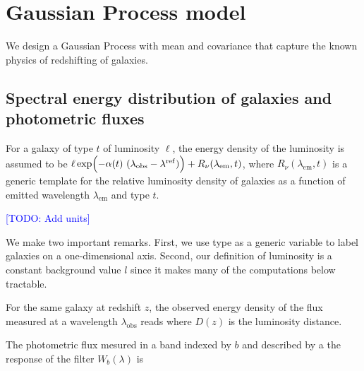 \documentclass[aps,prd,showpacs,superscriptaddress,groupedaddress]{revtex4}  %
\newcommand{\todo}[1]{\textcolor{blue}{[TODO: #1]}}
\begin{document}
\section{Gaussian Process model}

We design a Gaussian Process with mean and covariance that capture the known physics of redshifting of galaxies.

\subsection{Spectral energy distribution of galaxies and photometric fluxes}

For a galaxy of type $t$ of luminosity $\ell$, the energy density of the luminosity is assumed to be $\ell \exp\Bigl(-\alpha(t)\ (\lambda_\mathrm{obs}-\lambda^\mathrm{ref})\Bigr)  + R_\nu(\lambda_\mathrm{em},t)$, where $R_\nu(\lambda_\mathrm{em},t)$ is a generic template for the relative luminosity density of galaxies as a function of emitted wavelength $\lambda_\mathrm{em}$ and type $t$.

\todo{Add units}

We make two important remarks.
First, we use type as a generic variable to label galaxies on a one-dimensional axis. 
Second, our definition of luminosity is a constant background value $l$ since it makes many of the computations below tractable.

For the same galaxy at redshift $z$, the observed energy density of the flux measured at a wavelength $\lambda_\mathrm{obs}$ reads
where $D(z)$ is the luminosity distance.

The photometric flux mesured in a band indexed by $b$ and described by a the response of the filter $W_b(\lambda)$ is
\end{document}
